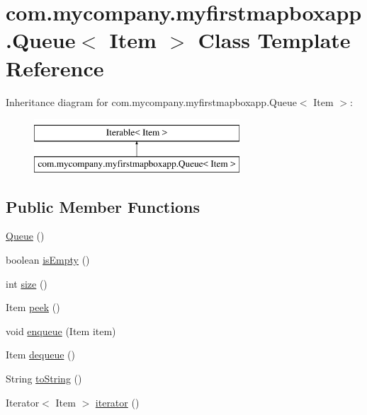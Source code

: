 \hypertarget{classcom_1_1mycompany_1_1myfirstmapboxapp_1_1_queue}{}\section{com.\+mycompany.\+myfirstmapboxapp.\+Queue$<$ Item $>$ Class Template Reference}
\label{classcom_1_1mycompany_1_1myfirstmapboxapp_1_1_queue}
Inheritance diagram for com.\+mycompany.\+myfirstmapboxapp.\+Queue$<$ Item $>$\+:\begin{figure}[H]
\begin{center}
\leavevmode
\includegraphics[height=2.000000cm]{classcom_1_1mycompany_1_1myfirstmapboxapp_1_1_queue}
\end{center}
\end{figure}
\subsection*{Public Member Functions}
\begin{DoxyCompactItemize}
\item 
\hyperlink{classcom_1_1mycompany_1_1myfirstmapboxapp_1_1_queue_a5dd70f04adf8da1736bb5eb94ad0d95b}{Queue} ()
\item 
boolean \hyperlink{classcom_1_1mycompany_1_1myfirstmapboxapp_1_1_queue_add4126d7476d2b4cabb797cb158d7320}{is\+Empty} ()
\item 
int \hyperlink{classcom_1_1mycompany_1_1myfirstmapboxapp_1_1_queue_a5f04295747159659edc9f7c0460b675b}{size} ()
\item 
Item \hyperlink{classcom_1_1mycompany_1_1myfirstmapboxapp_1_1_queue_a57cba1ae35a323f424eea8e1d194e121}{peek} ()
\item 
void \hyperlink{classcom_1_1mycompany_1_1myfirstmapboxapp_1_1_queue_a2c341b688fd1aaffe67ac1d1803e908b}{enqueue} (Item item)
\item 
Item \hyperlink{classcom_1_1mycompany_1_1myfirstmapboxapp_1_1_queue_a37c8b702019bda3297814a8ee452345f}{dequeue} ()
\item 
String \hyperlink{classcom_1_1mycompany_1_1myfirstmapboxapp_1_1_queue_ab1f1a432abb3c2b451746a56f591a241}{to\+String} ()
\item 
Iterator$<$ Item $>$ \hyperlink{classcom_1_1mycompany_1_1myfirstmapboxapp_1_1_queue_a650e762b3bc9d365a2fc983a0066c5be}{iterator} ()
\end{DoxyCompactItemize}
